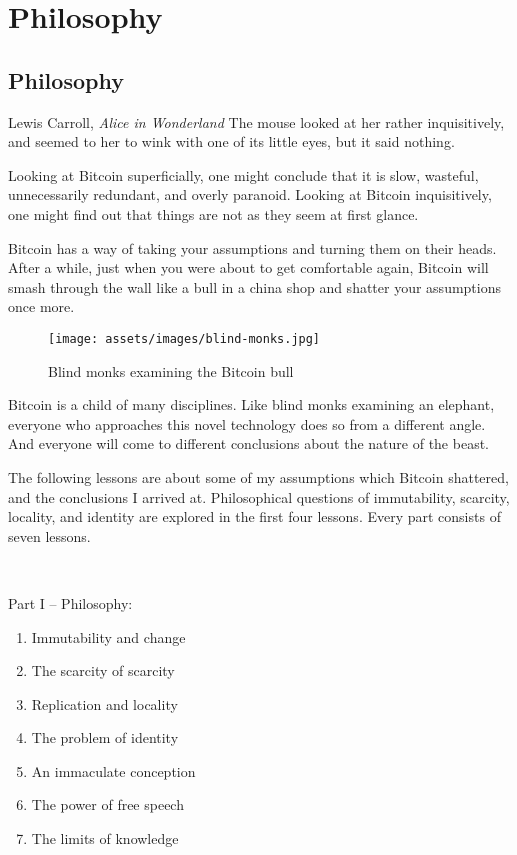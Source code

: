 \part{Philosophy}
\label{ch:philosophy}
\chapter*{Philosophy}

\begin{chapquote}{Lewis Carroll, \textit{Alice in Wonderland}}
The mouse looked at her rather inquisitively, and seemed to her to wink with one
of its little eyes, but it said nothing.
\end{chapquote}

Looking at Bitcoin superficially, one might conclude that it is slow, wasteful,
unnecessarily redundant, and overly paranoid. Looking at Bitcoin inquisitively,
one might find out that things are not as they seem at first glance.

Bitcoin has a way of taking your assumptions and turning them on their heads.
After a while, just when you were about to get comfortable again, Bitcoin will
smash through the wall like a bull in a china shop and shatter your assumptions
once more.

\begin{figure}
  \texttt{[image: assets/images/blind-monks.jpg]}
  \caption{Blind monks examining the Bitcoin bull}
  \label{fig:blind-monks}
\end{figure}

Bitcoin is a child of many disciplines. Like blind monks examining an elephant,
everyone who approaches this novel technology does so from a different angle.
And everyone will come to different conclusions about the nature of the beast.

The following lessons are about some of my assumptions which Bitcoin shattered,
and the conclusions I arrived at. Philosophical questions of immutability,
scarcity, locality, and identity are explored in the first four lessons.  Every
part consists of seven lessons.

~

Part I -- Philosophy:

\begin{enumerate}
  \item Immutability and change
  \item The scarcity of scarcity
  \item Replication and locality
  \item The problem of identity
  \item An immaculate conception
  \item The power of free speech
  \item The limits of knowledge
\end{enumerate}


